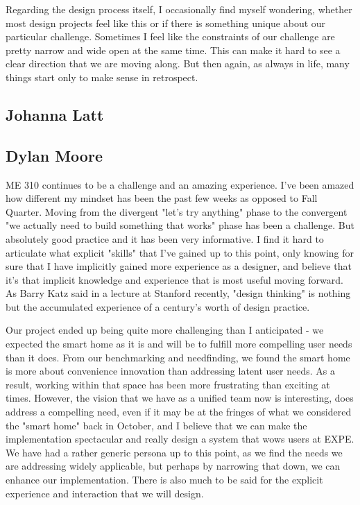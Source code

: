 Regarding the design process itself, I occasionally find myself wondering, whether most design projects feel like this or if there is something unique about our particular challenge. Sometimes I feel like the constraints of our challenge are pretty narrow and wide open at the same time. This can make it hard to see a clear direction that we are moving along. But then again, as always in life, many things start only to make sense in retrospect.

\subsection*{Johanna Latt}
\subsection*{Dylan Moore}
ME 310 continues to be a challenge and an amazing experience. I've been amazed how different my mindset has been the past few weeks as opposed to Fall Quarter. Moving from the divergent "let's try anything" phase to the convergent "we actually need to build something that works" phase has been a challenge. But absolutely good practice and it has been very informative. I find it hard to articulate what explicit "skills" that I've gained up to this point, only knowing for sure that I have implicitly gained more experience as a designer, and believe that it's that implicit knowledge and experience that is most useful moving forward. As Barry Katz said in a lecture at Stanford recently, "design thinking" is nothing but the accumulated experience of a century's worth of design practice. 

Our project ended up being quite more challenging than I anticipated - we expected the smart home as it is and will be to fulfill more compelling user needs than it does. From our benchmarking and needfinding, we found the smart home is more about convenience innovation than addressing latent user needs. As a result, working within that space has been more frustrating than exciting at times. However, the vision that we have as a unified team now is interesting, does address a compelling need, even if it may be at the fringes of what we considered the "smart home" back in October, and I believe that we can make the implementation spectacular and really design a system that wows users at EXPE. We have had a rather generic persona up to this point, as we find the needs we are addressing widely applicable, but perhaps by narrowing that down, we can enhance our implementation. There is also much to be said for the explicit experience and interaction that we will design.

